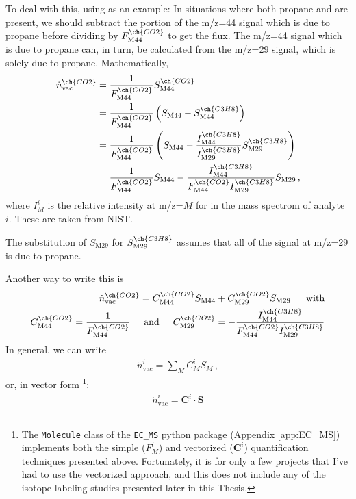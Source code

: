 To deal with this, using  as an example: In situations where both propane and  are present, we should subtract the portion of the m/z=44 signal which is due to propane before dividing by $F_\text{M44}^{\ch{CO2}}$ to get the  flux. The m/z=44 signal which is due to propane can, in turn, be calculated from the m/z=29 signal, which is solely due to propane. Mathematically,
\begin{align}
\dot{n}^{\ch{CO2}}_{\text{vac}} &= \frac{1}{F^{\ch{CO2}}_\text{M44}}S^{\ch{CO2}}_\text{M44}\\
&= \frac{1}{F^{\ch{CO2}}_\text{M44}}\left(
S_\text{M44} - S^{\ch{C3H8}}_\text{M44}
\right)\\
&= \frac{1}{F^{\ch{CO2}}_\text{M44}}\left(
S_\text{M44} - \frac{I^{\ch{C3H8}}_\text{M44}}{I^{\ch{C3H8}}_\text{M29}}S^{\ch{C3H8}}_\text{M29}
\right)\\
&= \frac{1}{F^{\ch{CO2}}_\text{M44}}S_\text{M44} - \frac{I^{\ch{C3H8}}_\text{M44}}{F^{\ch{CO2}}_\text{M44}I^{\ch{C3H8}}_\text{M29}}S_\text{M29}\,,
\end{align}
where $I_M^i$ is the relative intensity at m/z=$M$ for in the mass spectrom of analyte $i$. These are taken from NIST. 

The substitution of $S_\text{M29}$ for $S^{\ch{C3H8}}_\text{M29}$ assumes that all of the signal at m/z=29 is due to propane.

Another way to write this is 
\begin{align}
\dot{n}^{\ch{CO2}}_{\text{vac}} = C_\text{M44}^{\ch{CO2}} S_\text{M44} + C_\text{M29}^{\ch{CO2}} S_\text{M29}
\,\hspace{5mm}\text{with}\\
C_\text{M44}^{\ch{CO2}} = \frac{1}{F_\text{M44}^{\ch{CO2}}}\hspace{5mm}\text{and}\hspace{5mm} C_\text{M29}^{\ch{CO2}} = - \frac{I^{\ch{C3H8}}_\text{M44}}{F^{\ch{CO2}}_\text{M44}I^{\ch{C3H8}}_\text{M29}}
\end{align} 
In general, we can write 
\begin{align}
\dot{n}^{i}_{\text{vac}} = \sum_M C_M^i S_M\,,
\end{align}
or, in vector form
\footnote{
The \texttt{Molecule} class of the \texttt{EC\_MS} python package (Appendix \ref{app:EC_MS}) implements both the simple ($F_M^i$) and vectorized ($\mathbf{C}^i$) quantification techniques presented above. Fortunately, it is for only a few projects that I've had to use the vectorized approach, and this does not include any of the isotope-labeling studies presented later in this Thesis.
}:
\begin{align}
\dot{n}^{i}_{\text{vac}} = \mathbf{C}^i \cdot \mathbf{S}
\end{align}




